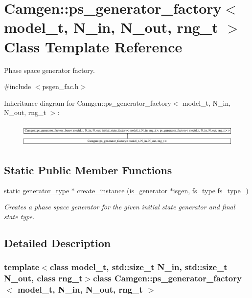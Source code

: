 \hypertarget{a00452}{}\section{Camgen\+:\+:ps\+\_\+generator\+\_\+factory$<$ model\+\_\+t, N\+\_\+in, N\+\_\+out, rng\+\_\+t $>$ Class Template Reference}
\label{a00452}


Phase space generator factory.  




{\ttfamily \#include $<$psgen\+\_\+fac.\+h$>$}

Inheritance diagram for Camgen\+:\+:ps\+\_\+generator\+\_\+factory$<$ model\+\_\+t, N\+\_\+in, N\+\_\+out, rng\+\_\+t $>$\+:\begin{figure}[H]
\begin{center}
\leavevmode
\includegraphics[height=1.187699cm]{a00452}
\end{center}
\end{figure}
\subsection*{Static Public Member Functions}
\begin{DoxyCompactItemize}
\item 
static \hyperlink{a00450}{generator\+\_\+type} $\ast$ \hyperlink{a00452_a1b1e7a3927dabb9fc2abd7d249ef7d19}{create\+\_\+instance} (\hyperlink{a00308}{is\+\_\+generator} $\ast$isgen, fs\+\_\+type fs\+\_\+type\+\_\+)
\begin{DoxyCompactList}\small\item\em Creates a phase space generator for the given initial state generator and final state type. \end{DoxyCompactList}\end{DoxyCompactItemize}


\subsection{Detailed Description}
\subsubsection*{template$<$class model\+\_\+t, std\+::size\+\_\+t N\+\_\+in, std\+::size\+\_\+t N\+\_\+out, class rng\+\_\+t$>$class Camgen\+::ps\+\_\+generator\+\_\+factory$<$ model\+\_\+t, N\+\_\+in, N\+\_\+out, rng\+\_\+t $>$}


